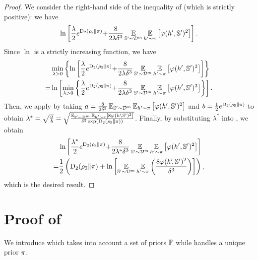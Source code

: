 \begin{noaddcontents}
\proplambdamin*
\begin{proof}
We consider the right-hand side of the inequality of  (which is strictly positive): we have 
\begin{align}
\ln\LB \frac{\lambda}{2} e^{\Renyi_{2}(\AQ\|\P)} {+} \frac{8}{2\lambda\delta^3}\EE_{\S'{\sim}\D^{\m}}\EE_{\h'{\sim}\P}\LB\varphi(\h', \S')^2\RB\RB.
\label{chap:dis-pra:eq:prop:lambda-min-1}
\end{align}
Since $\ln$ is a strictly increasing function, we have
\begin{align*}
    &\min_{\lambda>0}\LC \ln\LB \frac{\lambda}{2} e^{\Renyi_{2}(\AQ\|\P)} {+} \frac{8}{2\lambda\delta^3}\EE_{\S'{\sim}\D^{\m}}\EE_{\h'{\sim}\P}\LB\varphi(\h', \S')^2\RB\RB \RC\\
    = &\ln\LB\min_{\lambda>0}\LC \frac{\lambda}{2} e^{\Renyi_{2}(\AQ\|\P)} {+} \frac{8}{2\lambda\delta^3}\EE_{\S'{\sim}\D^{\m}}\EE_{\h'{\sim}\P}\LB\varphi(\h', \S')^2\RB\RC\RB.
\end{align*}
Then, we apply  by taking $a = \frac{8}{2\delta^3}\EE_{\S'{\sim}\D^{\m}}\EE_{\h'{\sim}\P}\LB\varphi(\h', \S')^2\RB$ and $b=\frac{1}{2}e^{\Renyi_{2}(\AQ\|\P)}$ to obtain $\lambda^*=\sqrt{\frac{a}{b}}= \sqrt{\frac{\EE_{\S'{\sim}\D^{\m}}{\EE}_{{\h'{\sim}\P}}\LB8\varphi(\h'\!, \S')^2\RB}{\delta^3 \exp(\Renyi_{2}(\AQ\|\P))}}$.
Finally, by substituting $\lambda^*$ into , we obtain
\begin{align*}
    &\ln\LB \frac{\lambda^*}{2} e^{\Renyi_{2}(\AQ\|\P)} {+} \frac{8}{2\lambda^*\delta^3}\EE_{\S'{\sim}\D^{\m}}\EE_{\h'{\sim}\P}\LB\varphi(\h', \S')^2\RB\RB\\
    = &\frac{1}{2}\LP \Renyi_{2}(\AQ\|\P) + \ln\LB\EE_{\S'{\sim}\D^{\m}}\EE_{\h'{\sim} \P}
\LP\frac{8\varphi(\h'\!, \S')^{2}}{\delta^3}\RP\RB\RP, 
\end{align*}
which is the desired result.
\end{proof}

\section{Proof of }
\label{chap:dis-pra:sec:proof-corollary-nn}

We introduce  which takes into account a set of priors $\priorset$ while  handles a unique prior $\P$.


\end{noaddcontents}
